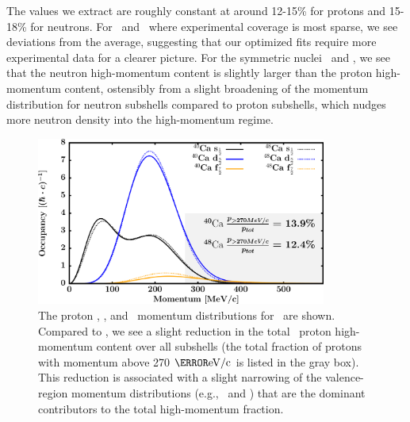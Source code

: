 The values we extract are roughly constant at around 12-15\% for protons and
15-18\% for neutrons. For
\snTwelve\ and \snFour\ where experimental coverage is most sparse, we
see deviations from the average, suggesting that our optimized fits require more
experimental data for a clearer picture. For the symmetric nuclei \oSix\ and \caForty,
we see that the neutron high-momentum
content is slightly larger than the proton high-momentum content, ostensibly
from a slight
broadening of the momentum distribution for neutron subshells compared to proton
subshells, which nudges more neutron density into the high-momentum regime.
\begin{figure}[tb]
    \centering
    \includegraphics[width=0.85\textwidth]{figures/CaMomenta.png}
    \caption[Proton single-particle momentum distributions in \caAughtEight]
    {
        The proton \sOne, \dFive, and \fSeven\ momentum distributions for
        \caAughtEight\ are shown. Compared to \caForty, we see a slight reduction
        in the total \caEight\ proton high-momentum content over all subshells
        (the total fraction of protons with momentum above 270 $\mega\electronvolt/\text{c}$
        is listed in the gray box). This reduction is associated with a slight narrowing of the
        valence-region momentum distributions (e.g., \dFive\ and \fSeven)
        that are the dominant contributors to the total high-momentum fraction.
    }
    \label{CaMomenta}
\end{figure}

